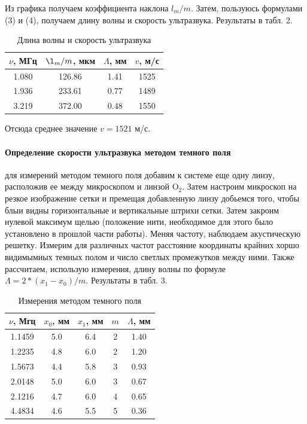 \documentclass[a4paper,12pt]{article}
\begin{document}
\noindent
Из графика получаем коэффициента наклона $l_m / m$. Затем, пользуюсь формулами (3) и (4), получаем длину волны и скорость ультразвука. Результаты в табл. 2.

\begin{table}[H]
    \centering
    \caption{Длина волны и скорость ультразвука}
    \begin{tabular}{|c|c|c|c|} \hline
        $\nu$, МГц & $\l_m / m$, мкм & $\Lambda$, мм & $v$, м/с  \\ \hline
        1.080 & 126.86 & 1.41 & 1525 \\ \hline
        1.936 & 233.61 & 0.77 & 1489 \\ \hline
        3.219 & 372.00 & 0.48 & 1550 \\ \hline
    \end{tabular}
\end{table}

\noindent
Отсюда среднее значение $v = 1521$ м/с.

\paragraph{Определение скорости ультразвука методом темного поля} для измерений методом темного поля добавим к системе еще одну линзу, расположив ее между микроскопом и линзой O$_2$. Затем настроим микроскоп на резкое изображение сетки и премещая добавленную линзу добьемся того, чтобы блыи видны горизонтальные и вертикальные штрихи сетки. Затем закроим нулевой максимум щелью (положение нити, необходимое для этого было установлено в прошлой части работы). Меняя частоту, наблюдаем акустическую решетку. Измерим для различных частот расстояние координаты крайних хоршо видимымиых темных полом и число светлых промежутков между ними. Также рассчитаем, использую измерения, длину волны по формуле $\Lambda = 2 * (x_1 - x_0) / m$. Результаты в табл. 3.

\begin{table}[H]
    \centering
    \caption{Измерения методом темного поля}
    \begin{tabular}{|c|c|c|c|c|} \hline
        $\nu$, Мгц & $x_0$, мм & $x_1$, мм & $m$ & $\Lambda$, мм \\ \hline
        1.1459 & 5.0 & 6.4 & 2 & 1.40 \\ \hline
        1.2235 & 4.8 & 6.0 & 2 & 1.20 \\ \hline
        1.5673 & 4.4 & 5.8 & 3 & 0.93 \\ \hline
        2.0148 & 5.0 & 6.0 & 3 & 0.67 \\ \hline
        2.1216 & 4.7 & 6.0 & 4 & 0.65 \\ \hline
        4.4834 & 4.6 & 5.5 & 5 & 0.36 \\ \hline
    \end{tabular}
\end{table}
\end{document}
